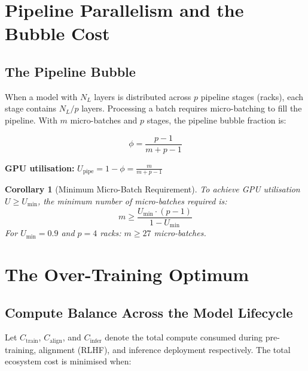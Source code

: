 \documentclass[11pt,a4paper]{article}
\newtheorem{corollary}[theorem]{Corollary}
\begin{document}
\section{Pipeline Parallelism and the Bubble Cost}
\label{sec:pipeline}

\subsection{The Pipeline Bubble}

When a model with $N_L$ layers is distributed across $p$ pipeline stages
(racks), each stage contains $N_L/p$ layers. Processing a batch requires
micro-batching to fill the pipeline. With $m$ micro-batches and $p$ stages,
the pipeline bubble fraction is:

\begin{equation}
  \phi = \frac{p - 1}{m + p - 1}
  \label{eq:bubble}
\end{equation}

\textbf{GPU utilisation:} $U_\text{pipe} = 1 - \phi = \frac{m}{m + p - 1}$

\begin{corollary}[Minimum Micro-Batch Requirement]
To achieve GPU utilisation $U \geq U_\text{min}$, the minimum number of
micro-batches required is:
\[
  m \geq \frac{U_\text{min} \cdot (p-1)}{1 - U_\text{min}}
\]
For $U_\text{min} = 0.9$ and $p = 4$ racks: $m \geq 27$ micro-batches.
\end{corollary}

\section{The Over-Training Optimum}
\label{sec:overtrain}

\subsection{Compute Balance Across the Model Lifecycle}

Let $C_\text{train}$, $C_\text{align}$, and $C_\text{infer}$ denote the
total compute consumed during pre-training, alignment (RLHF), and inference
deployment respectively. The total ecosystem cost is minimised when:
\end{document}
